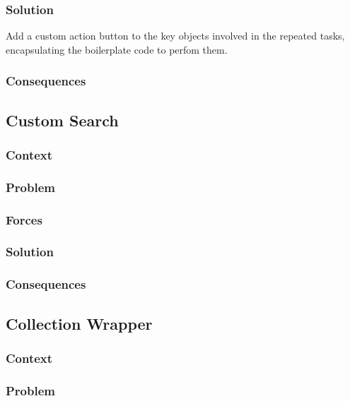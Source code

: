 \documentclass[sigconf]{acmart}
\begin{document}
\subsubsection*{Solution}

Add a custom action button to the key objects involved in the repeated tasks, encapsulating the boilerplate code to perfom them.


\subsubsection*{Consequences}

\subsection*{Custom Search}\label{pat:customSearch}
\subsubsection*{Context}
\subsubsection*{Problem}
\subsubsection*{Forces}
\subsubsection*{Solution}
\subsubsection*{Consequences}

\subsection*{Collection Wrapper}\label{pat:collectionWrapper}
\subsubsection*{Context}
\subsubsection*{Problem}
\end{document}
